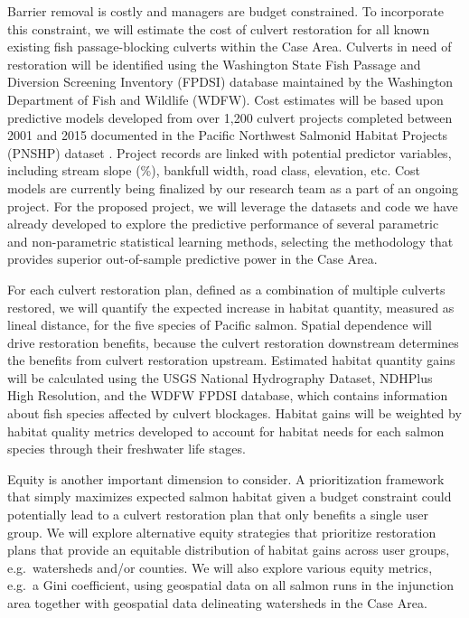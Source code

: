 \documentclass[12pt]{elsarticle}
\begin{document}
	Barrier removal is costly and managers are budget constrained. To incorporate this constraint, we will estimate the cost of culvert restoration for all known existing fish passage-blocking culverts within the Case Area. Culverts in need of restoration will be identified using the Washington State Fish Passage and Diversion Screening Inventory (FPDSI) database maintained by the Washington Department of Fish and Wildlife (WDFW). Cost estimates will be based upon predictive models developed from over 1,200 culvert projects completed between 2001 and 2015 documented in the Pacific Northwest Salmonid Habitat Projects (PNSHP) dataset \citep{katz_freshwater_2007,noauthor_pacific_2021}. Project records are linked with potential predictor variables, including stream slope (\%), bankfull width, road class, elevation, etc. Cost models are currently being finalized by our research team as a part of an ongoing project. For the proposed project, we will leverage the datasets and code we have already developed to explore the predictive performance of several parametric and non-parametric statistical learning methods, selecting the methodology that provides superior out-of-sample predictive power in the Case Area.
	
	For each culvert restoration plan, defined as a combination of multiple culverts restored, we will quantify the expected increase in habitat quantity, measured as lineal distance, for the five species of Pacific salmon. Spatial dependence will drive restoration benefits, because the culvert restoration downstream determines the benefits from culvert restoration upstream. Estimated habitat quantity gains will be calculated using the USGS National Hydrography Dataset, NDHPlus High Resolution, and the WDFW FPDSI database, which contains information about fish species affected by culvert blockages. Habitat gains will be weighted by habitat quality metrics developed to account for habitat needs for each salmon species through their freshwater life stages. 
	
	Equity is another important dimension to consider. A prioritization framework that simply maximizes expected salmon habitat given a budget constraint could potentially lead to a culvert restoration plan that only benefits a single user group. We will explore alternative equity strategies that prioritize restoration plans that provide an equitable distribution of habitat gains across user groups, e.g.\ watersheds and/or counties. We will also explore various equity metrics, e.g.\ a Gini coefficient, using geospatial data on all salmon runs in the injunction area together with geospatial data delineating watersheds in the Case Area. 
	
\end{document}
